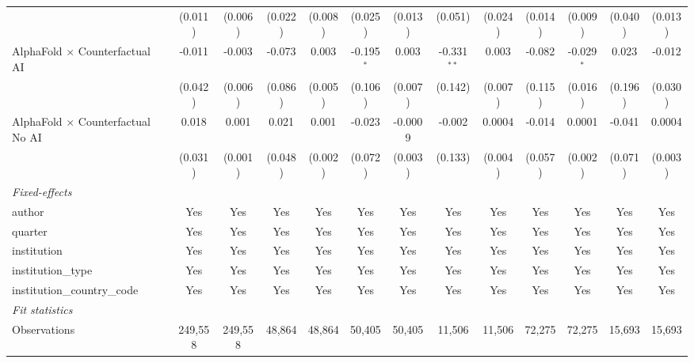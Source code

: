 \begin{tabular}{lcccccccccccc}
                                            & (0.011)      & (0.006) & (0.022) & (0.008) & (0.025)      & (0.013)  & (0.051)       & (0.024) & (0.014)      & (0.009)      & (0.040)     & (0.013)\\   
   AlphaFold $\times$ Counterfactual AI     & -0.011       & -0.003  & -0.073  & 0.003   & -0.195$^{*}$ & 0.003    & -0.331$^{**}$ & 0.003   & -0.082       & -0.029$^{*}$ & 0.023       & -0.012\\   
                                            & (0.042)      & (0.006) & (0.086) & (0.005) & (0.106)      & (0.007)  & (0.142)       & (0.007) & (0.115)      & (0.016)      & (0.196)     & (0.030)\\   
   AlphaFold $\times$ Counterfactual No AI  & 0.018        & 0.001   & 0.021   & 0.001   & -0.023       & -0.0009  & -0.002        & 0.0004  & -0.014       & 0.0001       & -0.041      & 0.0004\\   
                                            & (0.031)      & (0.001) & (0.048) & (0.002) & (0.072)      & (0.003)  & (0.133)       & (0.004) & (0.057)      & (0.002)      & (0.071)     & (0.003)\\   
   \midrule
   \emph{Fixed-effects}\\
   author                                   & Yes          & Yes     & Yes     & Yes     & Yes          & Yes      & Yes           & Yes     & Yes          & Yes          & Yes         & Yes\\  
   quarter                                  & Yes          & Yes     & Yes     & Yes     & Yes          & Yes      & Yes           & Yes     & Yes          & Yes          & Yes         & Yes\\  
   institution                              & Yes          & Yes     & Yes     & Yes     & Yes          & Yes      & Yes           & Yes     & Yes          & Yes          & Yes         & Yes\\  
   institution\_type                        & Yes          & Yes     & Yes     & Yes     & Yes          & Yes      & Yes           & Yes     & Yes          & Yes          & Yes         & Yes\\  
   institution\_country\_code               & Yes          & Yes     & Yes     & Yes     & Yes          & Yes      & Yes           & Yes     & Yes          & Yes          & Yes         & Yes\\  
   \midrule
   \emph{Fit statistics}\\
   Observations                             & 249,558      & 249,558 & 48,864  & 48,864  & 50,405       & 50,405   & 11,506        & 11,506  & 72,275       & 72,275       & 15,693      & 15,693\\  

\end{tabular}
